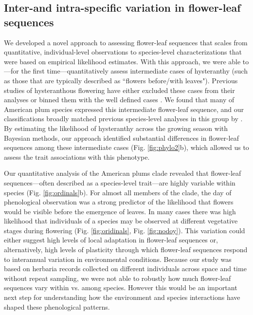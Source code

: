 \documentclass{article}[12pt]
\begin{document}
\subsection*{Inter-and intra-specific variation in flower-leaf sequences} %
We developed a novel approach to assessing flower-leaf sequences that scales from quantitative, individual-level observations to species-level characterizations that were based on empirical likelihood estimates. With this approach, we were able to---for the first time---quantitatively assess intermediate cases of hysteranthy (such as those that are typically described as ``flowers before/with leaves"). Previous studies of hysteranthous flowering have either excluded these cases from their analyses  \citep[e.g.;][]{Gougherty2018} or binned them with the well defined cases \citep[e.g.;][]{Buonaiuto2020}. We found that many of American plum species expressed this intermediate flower-leaf sequence, and our classifications broadly matched previous species-level analyses in this group by \citet{Shaw:2004aa}. By estimating the likelihood of hysteranthy across the growing season with Bayesian methods, our approach identified substantial differences in flower-leaf sequences among these intermediate cases (Fig. \ref{fig:phylo2}b), which allowed us to assess the trait associations with this phenotype.

Our quantitative analysis of the American plums clade revealed that flower-leaf sequences---often described as a species-level trait---are highly variable within species (Fig. \ref{fig:ordinals}b). For almost all members of the clade, the day of phenological observation was a strong predictor of the likelihood that flowers would be visible before the emergence of leaves. In many cases there was high likelihood that individuals of a species may be observed at different vegetative stages during flowering (Fig.  \ref{fig:oridinals}, Fig. \ref{fig:nodoy}). This variation could either suggest high levels of local adaptation in flower-leaf sequences or, alternatively, high levels of plasticity through which flower-leaf sequences respond to interannual variation in environmental conditions. Because our study was based on herbaria records collected on different individuals across space and time without repeat sampling, we were not able to robustly how much flower-leaf sequences vary within vs. among species. However this would be an important next step for understanding how the environment and species interactions have shaped these phenological patterns.
\end{document}
